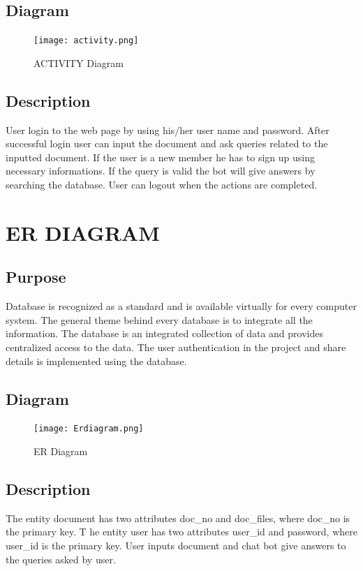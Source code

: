 \documentclass[12pt,a4paper,oneside]{report}
\begin{document}
\subsection{Diagram}
\begin{figure}[h]
  	\begin{center}
  		\texttt{[image: activity.png]}
  			\caption{ACTIVITY Diagram}
  			\label{ACTIVITY Diagram}
  	\end{center}
  \end{figure}
 \newpage
\subsection{Description}
\par User login to the web page by using his/her user name and password. After successful login user can input the document and ask queries related to the inputted document. If the user is a new member he has to sign up using necessary informations. If the query is valid the bot will give answers by searching the database. User can  logout when the actions are completed.\\ 
\section{ER DIAGRAM}
\subsection{Purpose}
Database is recognized as a standard and is available virtually for every computer system.
The general theme behind every database is to integrate all the information. The database is an
integrated collection of data and provides centralized access to the data. The user authentication
in the project and share details is implemented using the database.
\subsection{Diagram}
\begin{figure}[h]
  	\begin{center}
  		\texttt{[image: Erdiagram.png]}
  			\caption{ER Diagram}
  			\label{ER Diagram}
  	\end{center}
  \end{figure}
  \newpage
\subsection{Description}
The entity document has two attributes doc\_no and doc\_files, where doc\_no is the primary key. T
he entity user has two attributes user\_id and password, where user\_id is the primary key. User inputs document and chat bot give answers to the queries asked by user.
\end{document}
